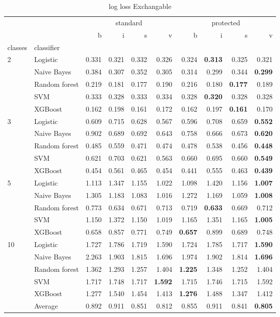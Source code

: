 \begin{table}
\caption{log loss Exchangable}
\begin{tabular}{l|l|rrrr|rrrr}
\toprule
 &  & \multicolumn{4}{c}{standard} & \multicolumn{4}{c}{protected} \\
 &  & b & i & s & v & b & i & s & v \\
classes & classifier &  &  &  &  &  &  &  &  \\
\midrule
\midrule
\multirow[c]{5}{*}{2} & Logistic & 0.331 & 0.321 & 0.332 & 0.326 & 0.324 & \textbf{0.313} & 0.325 & 0.321 \\
 & Naive Bayes & 0.384 & 0.307 & 0.352 & 0.305 & 0.314 & 0.299 & 0.344 & \textbf{0.299} \\
 & Random forest & 0.219 & 0.181 & 0.177 & 0.190 & 0.216 & 0.180 & \textbf{0.177} & 0.189 \\
 & SVM & 0.333 & 0.328 & 0.333 & 0.334 & 0.328 & \textbf{0.320} & 0.328 & 0.328 \\
 & XGBoost & 0.162 & 0.198 & 0.161 & 0.172 & 0.162 & 0.197 & \textbf{0.161} & 0.170 \\
\midrule
\multirow[c]{5}{*}{3} & Logistic & 0.609 & 0.715 & 0.628 & 0.567 & 0.596 & 0.708 & 0.659 & \textbf{0.552} \\
 & Naive Bayes & 0.902 & 0.689 & 0.692 & 0.643 & 0.758 & 0.666 & 0.673 & \textbf{0.620} \\
 & Random forest & 0.485 & 0.559 & 0.471 & 0.474 & 0.478 & 0.538 & 0.456 & \textbf{0.448} \\
 & SVM & 0.621 & 0.703 & 0.621 & 0.563 & 0.660 & 0.695 & 0.660 & \textbf{0.549} \\
 & XGBoost & 0.454 & 0.561 & 0.465 & 0.454 & 0.441 & 0.555 & 0.463 & \textbf{0.439} \\
\midrule
\multirow[c]{5}{*}{5} & Logistic & 1.113 & 1.347 & 1.155 & 1.022 & 1.098 & 1.420 & 1.156 & \textbf{1.007} \\
 & Naive Bayes & 1.305 & 1.183 & 1.083 & 1.016 & 1.272 & 1.169 & 1.059 & \textbf{1.008} \\
 & Random forest & 0.773 & 0.634 & 0.671 & 0.713 & 0.719 & \textbf{0.633} & 0.669 & 0.712 \\
 & SVM & 1.150 & 1.372 & 1.150 & 1.019 & 1.165 & 1.351 & 1.165 & \textbf{1.005} \\
 & XGBoost & 0.658 & 0.857 & 0.771 & 0.749 & \textbf{0.657} & 0.899 & 0.689 & 0.748 \\
\midrule
\multirow[c]{5}{*}{10} & Logistic & 1.727 & 1.786 & 1.719 & 1.590 & 1.724 & 1.785 & 1.717 & \textbf{1.590} \\
 & Naive Bayes & 2.263 & 1.903 & 1.815 & 1.696 & 1.974 & 1.902 & 1.814 & \textbf{1.696} \\
 & Random forest & 1.362 & 1.293 & 1.257 & 1.404 & \textbf{1.225} & 1.348 & 1.252 & 1.404 \\
 & SVM & 1.717 & 1.748 & 1.717 & \textbf{1.592} & 1.715 & 1.746 & 1.715 & 1.592 \\
 & XGBoost & 1.277 & 1.540 & 1.454 & 1.413 & \textbf{1.276} & 1.488 & 1.347 & 1.412 \\\midrule\ & Average & 0.892 & 0.911 & 0.851 & 0.812 & 0.855 & 0.911 & 0.841 & \textbf{0.805} \\
\bottomrule
\end{tabular}
\end{table}
